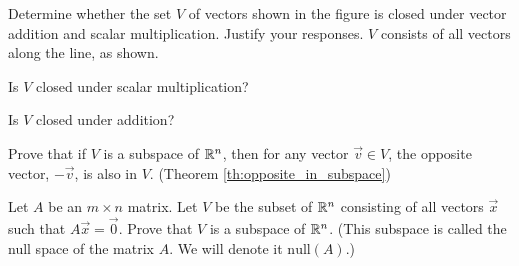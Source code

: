 \documentclass{ximera}
\begin{document}
\begin{problem} \label{prob:closedmultchoice2} Determine whether the set $V$ of vectors shown in the figure is closed under vector addition and scalar multiplication.  Justify your responses.
$V$ consists of all vectors along the line, as shown.

 
 Is $V$ closed under scalar multiplication?
 
 \begin{multipleChoice}
 \end{multipleChoice}
 
 Is $V$ closed under addition?
 
 \begin{multipleChoice}
 \end{multipleChoice}
\end{problem}    


\begin{problem}\label{prob:opposite_in_subspace}
Prove that if $V$ is a subspace of $\mathbb{R}^n$, then for any vector $\vec{v} \in V$, the opposite vector, $-\vec{v}$, is also in $V$. (Theorem \ref{th:opposite_in_subspace})
\end{problem}

\begin{problem}\label{prob:null(A)_is_subspace}
Let $A$ be an $m \times n$ matrix.  Let $V$ be the subset of $\mathbb{R}^n$ consisting of all vectors $\vec{x}$ such that $A \vec{x} = \vec{0}$.  Prove that $V$ is a subspace of $\mathbb{R}^n$.  (This subspace is called the null space of the matrix $A$.  We will denote it $\mbox{null}(A)$.)
\end{problem}
\end{document}
